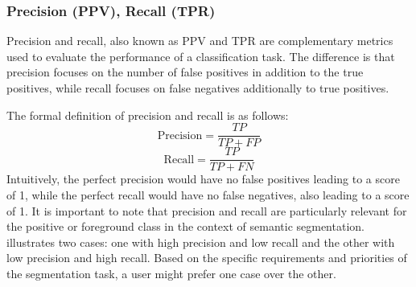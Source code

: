\subsubsection*{Precision (PPV), Recall (TPR)}
\label{subsubsec:precision_and_recall}
Precision and recall, also known as \ac{PPV} and \ac{TPR} are complementary metrics used to evaluate the performance of a classification task. The difference is that precision focuses on the number of false positives in addition to the true positives, while recall focuses on false negatives additionally to true positives.

The formal definition of precision and recall is as follows:
\begin{equation}
    \text{Precision}=\frac{TP}{TP+FP}
\end{equation}
\begin{equation}
    \text{Recall}=\frac{TP}{TP+FN}
\end{equation}
Intuitively, the perfect precision would have no false positives leading to a score of 1, while the perfect recall would have no false negatives, also leading to a score of 1. It is important to note that precision and recall are particularly relevant for the positive or foreground class in the context of semantic segmentation.  illustrates two cases: one with high precision and low recall and the other with low precision and high recall. Based on the specific requirements and priorities of the segmentation task, a user might prefer one case over the other.

